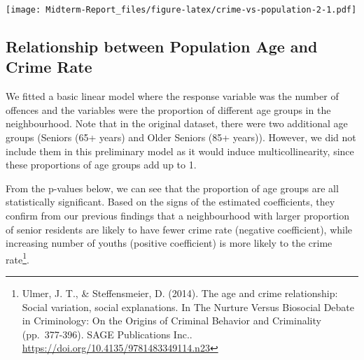 \documentclass[
]{article}
\begin{document}
\texttt{[image: Midterm-Report\_files/figure-latex/crime-vs-population-2-1.pdf]}

\hypertarget{relationship-between-population-age-and-crime-rate}{%
\subsection{Relationship between Population Age and Crime
Rate}\label{relationship-between-population-age-and-crime-rate}}

We fitted a basic linear model where the response variable was the
number of offences and the variables were the proportion of different
age groups in the neighbourhood. Note that in the original dataset,
there were two additional age groups (Seniors (65+ years) and Older
Seniors (85+ years)). However, we did not include them in this
preliminary model as it would induce multicollinearity, since these
proportions of age groups add up to 1.

From the p-values below, we can see that the proportion of age groups
are all statistically significant. Based on the signs of the estimated
coefficients, they confirm from our previous findings that a
neighbourhood with larger proportion of senior residents are likely to
have fewer crime rate (negative coefficient), while increasing number of
youths (positive coefficient) is more likely to the crime
rate\footnote{Ulmer, J. T., \& Steffensmeier, D. (2014). The age and
  crime relationship: Social variation, social explanations. In The
  Nurture Versus Biosocial Debate in Criminology: On the Origins of
  Criminal Behavior and Criminality (pp.~377-396). SAGE Publications
  Inc.. \url{https://doi.org/10.4135/9781483349114.n23}}.
\end{document}
